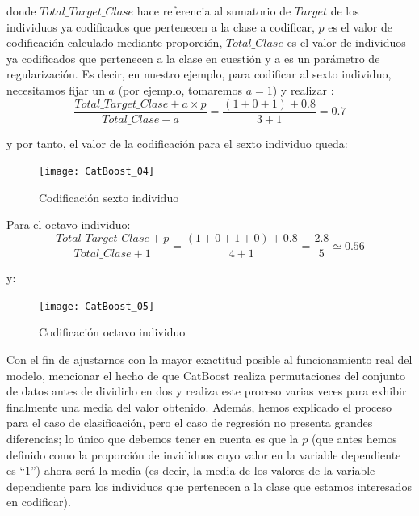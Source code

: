\documentclass[12pt,twoside]{article}
\begin{document}
\noindent
donde $Total\_Target\_Clase$ hace referencia al sumatorio de $Target$ de los individuos ya codificados que pertenecen a la clase a codificar, $p$ es el valor de codificación calculado mediante proporción, $Total\_Clase$ es el valor de individuos ya codificados que pertenecen a la clase en cuestión y a es un parámetro de regularización. Es decir, en nuestro ejemplo, para codificar al sexto individuo, necesitamos fijar un $a$ (por ejemplo, tomaremos $a=1$) y realizar :
\begin{equation*}
\frac{Total\_Target\_Clase + a \times p}{Total\_Clase + a} = \frac{(1 + 0 + 1) + 0.8}{3 + 1} = 0.7
\end{equation*}

\noindent
y por tanto, el valor de la codificación para el sexto individuo queda:
\begin{figure}[H]
\centering
\texttt{[image: CatBoost\_04]}
\caption{Codificación sexto individuo}
\end{figure}

Para el octavo individuo:
\begin{equation*}
\frac{Total\_Target\_Clase + p}{Total\_Clase + 1} = \frac{(1 + 0 + 1 + 0) + 0.8}{4 + 1} = \frac{2.8}{5} \simeq 0.56
\end{equation*}

\noindent
y:
\begin{figure}[h]
\centering
\texttt{[image: CatBoost\_05]}
\caption{Codificación octavo individuo}
\end{figure}

Con el fin de ajustarnos con la mayor exactitud posible al funcionamiento real del modelo, mencionar el hecho de que CatBoost realiza permutaciones del conjunto de datos antes de dividirlo en dos y realiza este proceso varias veces para exhibir finalmente una media del valor obtenido. Además, hemos explicado el proceso para el caso de clasificación, pero el caso de regresión no presenta grandes diferencias; lo único que debemos tener en cuenta es que la $p$ (que antes hemos definido como la proporción de invididuos cuyo valor en la variable dependiente es ``$1$'') ahora será la media (es decir, la media de los valores de la variable dependiente para los individuos que pertenecen a la clase que estamos interesados en codificar).

\end{document}
